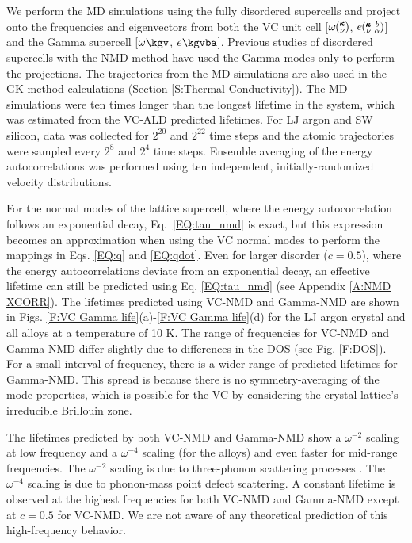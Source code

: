 We perform the MD simulations using the fully disordered supercells  
and project onto the frequencies and eigenvectors 
from both the VC unit cell [$\omega\mspace{-4.0mu}\left(\mspace{-8.0mu} \begin{smallmatrix}&\pmb{\kappa} \\&\nu \end{smallmatrix}\mspace{-3.0mu}\right)$, $e\mspace{-4.0mu}\left(\mspace{-8.0mu} \begin{smallmatrix} &\pmb{\kappa} &b \\ &\nu &\alpha \end{smallmatrix}\mspace{-3.0mu}\right)$] and the 
Gamma supercell [$\omega\kgv$, $e\kgvba$]. Previous studies of 
disordered supercells with the 
NMD method have used the Gamma modes only to perform the projections.
\cite{donadio_atomistic_2009,he_heat_2011,he_morphology_2011,
he_lattice_2012,hori_phonon_2013} 
The trajectories from 
the MD simulations are also used in the GK method calculations
(Section \ref{S:Thermal Conductivity}). 
The MD simulations were ten times longer than the 
longest lifetime in the system, which was  
estimated from the VC-ALD predicted lifetimes. For LJ 
argon and SW silicon, data was collected for $2^{20}$ and 
$2^{22}$ time steps and the atomic trajectories were sampled 
every $2^8$ and $2^4$ time steps. 
Ensemble averaging of the energy autocorrelations was performed 
using ten independent, initially-randomized velocity distributions. 

For the normal modes of the lattice supercell, where the energy 
autocorrelation follows an 
exponential decay,\cite{ladd_lattice_1986,turney_predicting_2009-1} 
Eq.~\eqref{EQ:tau_nmd} is exact, but this expression becomes an 
approximation when 
using the VC normal modes to perform the mappings in Eqs.  
\eqref{EQ:q} and \eqref{EQ:qdot}. 
Even for larger disorder ($c=0.5$),  
where the energy autocorrelations 
deviate from an exponential decay, 
an effective lifetime can still be predicted 
using Eq. \eqref{EQ:tau_nmd} (see Appendix \ref{A:NMD XCORR}). 
The lifetimes predicted using VC-NMD and Gamma-NMD  
are shown in Figs. \ref{F:VC Gamma life}(a)-\ref{F:VC Gamma life}(d) 
for the LJ argon crystal and all alloys at a temperature of 10 K. 
The range of frequencies for 
VC-NMD and Gamma-NMD differ slightly due to differences in 
the DOS (see Fig. \ref{F:DOS}). 
For a small interval of frequency, there is a wider range of 
predicted lifetimes for Gamma-NMD. This spread is because there 
is no symmetry-averaging of the mode properties, 
which is possible for the VC by considering the crystal 
lattice's irreducible Brillouin zone.\cite{ashcroft_solid_1976} 

The lifetimes predicted by both VC-NMD and Gamma-NMD 
show a $\omega^{-2}$ scaling at low frequency and a $\omega^{-4}$ 
scaling (for the alloys) and 
even faster for mid-range frequencies. The $\omega^{-2}$ scaling 
is due to three-phonon scattering processes
\cite{callaway_model_1959,maradudin_scattering_1962}. The 
$\omega^{-4}$ scaling is due to phonon-mass point defect 
scattering.\cite{klemens_scattering_1955,klemens_thermal_1957,mattis_phonon_1957,tamura_isotope_1983} 
A constant lifetime is observed at the highest frequencies  
for both VC-NMD and Gamma-NMD except at $c=0.5$ for VC-NMD. We are not 
aware of any theoretical prediction of this high-frequency behavior.

